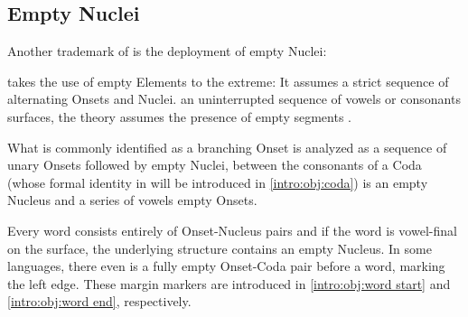 \subsection{Empty Nuclei}
\label{subsec:intro:empty N}

Another trademark of \SGP is the deployment of
empty Nuclei:

\CVCV takes the use of empty Elements to the extreme:
It assumes a strict sequence of alternating Onsets and Nuclei.
 an uninterrupted sequence of vowels or consonants
surfaces, the theory assumes the presence of empty segments
.

What is commonly identified as a branching Onset is analyzed
as a sequence of unary Onsets followed by empty Nuclei,
between the consonants of a Coda
(whose formal identity in \CVCV will be introduced in \cref{intro:obj:coda})
is an empty Nucleus and a series of vowels  empty Onsets.

Every word consists entirely of Onset-Nucleus pairs and
if the word is vowel-final on the surface,
the underlying structure contains an empty Nucleus.
In some languages, there even is a fully empty Onset-Coda pair before a word,
marking the left edge. These margin markers are introduced in \cref{intro:obj:word start}
and \cref{intro:obj:word end}, respectively.



